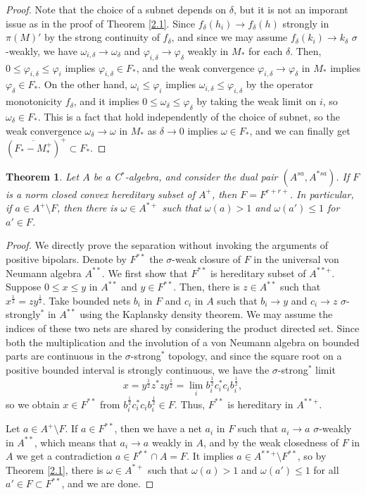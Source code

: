 \documentclass[noamsfonts,a4paper,10pt]{amsart}
\theoremstyle{plain}
\newtheorem{thm}{Theorem}[section]
\theoremstyle{definition}
\theoremstyle{remark}
\begin{document}
\begin{proof}
Note that the choice of a subnet depends on $\delta$, but it is not an imporant issue as in the proof of Theorem \ref{2.1}.
Since $f_\delta(h_i)\to f_\delta(h)$ strongly in $\pi(M)'$ by the strong continuity of $f_\delta$, and since we may assume $f_\delta(k_i)\to k_\delta$ $\sigma$-weakly, we have $\omega_{i,\delta}\to\omega_\delta$ and $\varphi_{i,\delta}\to\varphi_\delta$ weakly in $M_*$ for each $\delta$.
Then, $0\le\varphi_{i,\delta}\le\varphi_i$ implies $\varphi_{i,\delta}\in F_*$, and the weak convergence $\varphi_{i,\delta}\to\varphi_\delta$ in $M_*$ implies $\varphi_\delta\in F_*$.
On the other hand, $\omega_i\le\varphi_i$ implies $\omega_{i,\delta}\le\varphi_{i,\delta}$ by the operator monotonicity $f_\delta$, and it implies $0\le\omega_\delta\le\varphi_\delta$ by taking the weak limit on $i$, so $\omega_\delta\in F_*$.
This is a fact that hold independently of the choice of subnet, so the weak convergence $\omega_\delta\to\omega$ in $M_*$ as $\delta\to0$ implies $\omega\in F_*$, and we can finally get $(\overline{F_*-M_*^+})^+\subset F_*$.
\end{proof}



\begin{thm}
Let $A$ be a C$^*$-algebra, and consider the dual pair $(A^{sa},A^{*sa})$.
If $F$ is a norm closed convex hereditary subset of $A^+$, then $F=F^{r+r+}$. In particular, if $a\in A^+\setminus F$, then there is $\omega\in A^{*+}$ such that $\omega(a)>1$ and $\omega(a')\le1$ for $a'\in F$.
\end{thm}
\begin{proof}
We directly prove the separation without invoking the arguments of positive bipolars.
Denote by $F^{**}$ the $\sigma$-weak closure of $F$ in the universal von Neumann algebra $A^{**}$.
We first show that $F^{**}$ is hereditary subset of $A^{**+}$.
Suppose $0\le x\le y$ in $A^{**}$ and $y\in F^{**}$.
Then, there is $z\in A^{**}$ such that $x^{\frac12}=zy^{\frac12}$.
Take bounded nets $b_i$ in $F$ and $c_i$ in $A$ such that $b_i\to y$ and $c_i\to z$ $\sigma$-strongly$^*$ in $A^{**}$ using the Kaplansky density theorem.
We may assume the indices of these two nets are shared by considering the product directed set.
Since both the multiplication and the involution of a von Neumann algebra on bounded parts are continuous in the $\sigma$-strong$^*$ topology, and since the square root on a positive bounded interval is strongly continuous, we have the $\sigma$-strong$^*$ limit
\[x=y^{\frac12}z^*zy^{\frac12}=\lim_ib_i^{\frac12}c_i^*c_ib_i^{\frac12},\]
so we obtain $x\in F^{**}$ from $b_i^{\frac12}c_i^*c_ib_i^{\frac12}\in F$.
Thus, $F^{**}$ is hereditary in $A^{**+}$.

Let $a\in A^+\setminus F$.
If $a\in F^{**}$, then we have a net $a_i$ in $F$ such that $a_i\to a$ $\sigma$-weakly in $A^{**}$, which means that $a_i\to a$ weakly in $A$, and by the weak closedness of $F$ in $A$ we get a contradiction $a\in F^{**}\cap A=F$.
It implies $a\in A^{**+}\setminus F^{**}$, so by Theorem \ref{2.1}, there is $\omega\in A^{*+}$ such that $\omega(a)>1$ and $\omega(a')\le1$ for all $a'\in F\subset F^{**}$, and we are done.
\end{proof}
\end{document}
